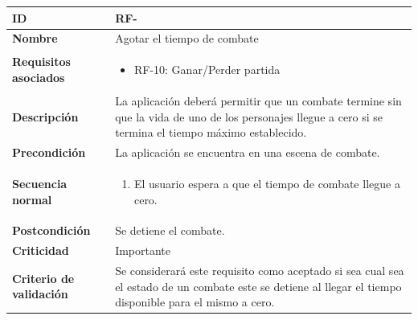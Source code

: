 \begin{center}
	\begin{tabular}{ | p{4.7cm} | p{10cm} | } 
		\hline
		
		\textbf{ID} & RF-\arabic{contador_requisitos_funcionales}
		{contador_requisitos_funcionales} \\
		
		\hline 
		\textbf{Nombre} &
		Agotar el tiempo de combate\\ 
		
		\hline
		\textbf{Requisitos asociados} & 
		\begin{itemize}
			\item RF-10: Ganar/Perder partida
		\end{itemize}\\
		
		\hline
		\textbf{Descripción} & 
		La aplicación deberá permitir que un combate termine sin que la vida de uno de los personajes llegue a cero si se termina el tiempo máximo establecido.\\
		
		\hline
		\textbf{Precondición} & 
		La aplicación se encuentra en una escena de combate.\\
		
		\hline
		\textbf{Secuencia normal} &
		\begin{enumerate}
			\item El usuario espera a que el tiempo de combate llegue a cero.
		\end{enumerate}
		\\
		
		\hline
		\textbf{Postcondición} & 
		Se detiene el combate.\\
		
		\hline 
		\textbf{Criticidad} &
		Importante\\
		
		\hline 
		\textbf{Criterio de validación} & 
		Se considerará este requisito como aceptado si sea cual sea el estado de un combate este se detiene al llegar el tiempo disponible para el mismo a cero.\\
		
		\hline
	\end{tabular}
\end{center}

